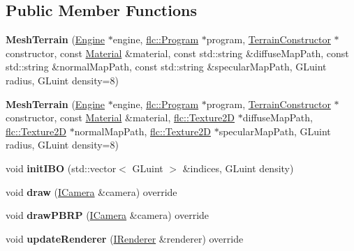 \subsection*{Public Member Functions}
\begin{DoxyCompactItemize}
\item 
{\bfseries Mesh\+Terrain} (\hyperlink{classflw_1_1Engine}{Engine} $\ast$engine, \hyperlink{classflw_1_1flc_1_1Program}{flc\+::\+Program} $\ast$program, \hyperlink{classflw_1_1flf_1_1TerrainConstructor}{Terrain\+Constructor} $\ast$constructor, const \hyperlink{classflw_1_1flf_1_1Material}{Material} \&material, const std\+::string \&diffuse\+Map\+Path, const std\+::string \&normal\+Map\+Path, const std\+::string \&specular\+Map\+Path, G\+Luint radius, G\+Luint density=8)\hypertarget{classflw_1_1flf_1_1MeshTerrain_a7a15826757332e1a22b1235f4995460e}{}\label{classflw_1_1flf_1_1MeshTerrain_a7a15826757332e1a22b1235f4995460e}

\item 
{\bfseries Mesh\+Terrain} (\hyperlink{classflw_1_1Engine}{Engine} $\ast$engine, \hyperlink{classflw_1_1flc_1_1Program}{flc\+::\+Program} $\ast$program, \hyperlink{classflw_1_1flf_1_1TerrainConstructor}{Terrain\+Constructor} $\ast$constructor, const \hyperlink{classflw_1_1flf_1_1Material}{Material} \&material, \hyperlink{classflw_1_1flc_1_1Texture2D}{flc\+::\+Texture2D} $\ast$diffuse\+Map\+Path, \hyperlink{classflw_1_1flc_1_1Texture2D}{flc\+::\+Texture2D} $\ast$normal\+Map\+Path, \hyperlink{classflw_1_1flc_1_1Texture2D}{flc\+::\+Texture2D} $\ast$specular\+Map\+Path, G\+Luint radius, G\+Luint density=8)\hypertarget{classflw_1_1flf_1_1MeshTerrain_ac64f0b15edb782474b3e8aefb05e90d4}{}\label{classflw_1_1flf_1_1MeshTerrain_ac64f0b15edb782474b3e8aefb05e90d4}

\item 
void {\bfseries init\+I\+BO} (std\+::vector$<$ G\+Luint $>$ \&indices, G\+Luint density)\hypertarget{classflw_1_1flf_1_1MeshTerrain_a8ae334e8ff48295d0f9cb170de3c8488}{}\label{classflw_1_1flf_1_1MeshTerrain_a8ae334e8ff48295d0f9cb170de3c8488}

\item 
void {\bfseries draw} (\hyperlink{classflw_1_1flf_1_1ICamera}{I\+Camera} \&camera) override\hypertarget{classflw_1_1flf_1_1MeshTerrain_a6a0a062b7d6efc39cbe4f54706758600}{}\label{classflw_1_1flf_1_1MeshTerrain_a6a0a062b7d6efc39cbe4f54706758600}

\item 
void {\bfseries draw\+P\+B\+RP} (\hyperlink{classflw_1_1flf_1_1ICamera}{I\+Camera} \&camera) override\hypertarget{classflw_1_1flf_1_1MeshTerrain_a4bf5d63ee35d329dc4a567bbc5d9540d}{}\label{classflw_1_1flf_1_1MeshTerrain_a4bf5d63ee35d329dc4a567bbc5d9540d}

\item 
void {\bfseries update\+Renderer} (\hyperlink{classflw_1_1flf_1_1IRenderer}{I\+Renderer} \&renderer) override\hypertarget{classflw_1_1flf_1_1MeshTerrain_ad2c900f0766fb8649df35ee05e98c5d1}{}\label{classflw_1_1flf_1_1MeshTerrain_ad2c900f0766fb8649df35ee05e98c5d1}

\end{DoxyCompactItemize}
